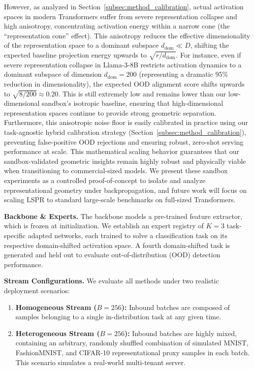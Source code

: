 However, as analyzed in Section~\ref{subsec:method_calibration}, actual activation spaces in modern Transformers suffer from severe representation collapse and high anisotropy, concentrating activation energy within a narrow cone (the ``representation cone'' effect). This anisotropy reduces the effective dimensionality of the representation space to a dominant subspace $d_{\text{dom}} \ll D$, shifting the expected baseline projection energy upwards to $\sqrt{r / d_{\text{dom}}}$. For instance, even if severe representation collapse in Llama-3-8B restricts activation dynamics to a dominant subspace of dimension $d_{\text{dom}} = 200$ (representing a dramatic 95\% reduction in dimensionality), the expected OOD alignment score shifts upwards to $\sqrt{8/200} \approx 0.20$. This is still extremely low and remains lower than our low-dimensional sandbox's isotropic baseline, ensuring that high-dimensional representation spaces continue to provide strong geometric separation. Furthermore, this anisotropic noise floor is easily calibrated in practice using our task-agnostic hybrid calibration strategy (Section~\ref{subsec:method_calibration}), preventing false-positive OOD rejections and ensuring robust, zero-shot serving performance at scale. This mathematical scaling behavior guarantees that our sandbox-validated geometric insights remain highly robust and physically viable when transitioning to commercial-sized models. We present these sandbox experiments as a controlled proof-of-concept to isolate and analyze representational geometry under backpropagation, and future work will focus on scaling LSPR to standard large-scale benchmarks on full-sized Transformers.

\textbf{Backbone \& Experts.} The backbone models a pre-trained feature extractor, which is frozen at initialization. We establish an expert registry of $K=3$ task-specific adapted networks, each trained to solve a classification task on its respective domain-shifted activation space. A fourth domain-shifted task is generated and held out to evaluate out-of-distribution (OOD) detection performance.

\textbf{Stream Configurations.} We evaluate all methods under two realistic deployment scenarios:
\begin{enumerate}
    \item \textbf{Homogeneous Stream ($B=256$):} Inbound batches are composed of samples belonging to a single in-distribution task at any given time.
    \item \textbf{Heterogeneous Stream ($B=256$):} Inbound batches are highly mixed, containing an arbitrary, randomly shuffled combination of simulated MNIST, FashionMNIST, and CIFAR-10 representational proxy samples in each batch. This scenario simulates a real-world multi-tenant server.
\end{enumerate}

